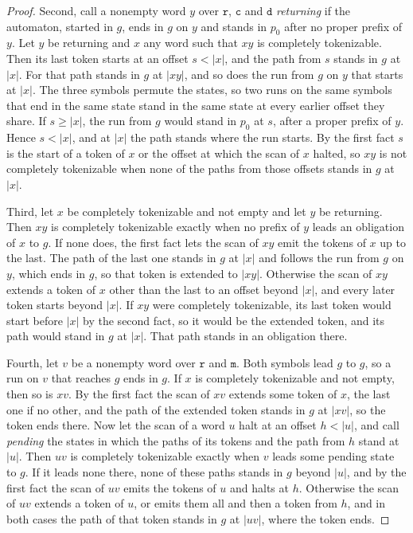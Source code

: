 \documentclass[11pt,a4paper]{article}
\theoremstyle{definition}
\theoremstyle{plain}
\newcommand{\code}[1]{\texttt{#1}}
\begin{document}
\begin{proof}
Second, call a nonempty word $y$ over $\code{r}$, $\code{c}$ and $\code{d}$ \emph{returning} if the automaton, started
in $g$, ends in $g$ on $y$ and stands in $p_0$ after no proper prefix of $y$. Let $y$ be returning and $x$ any word such
that $xy$ is completely tokenizable. Then its last token starts at an offset $s < |x|$, and the path from $s$ stands in
$g$ at $|x|$. For that path stands in $g$ at $|xy|$, and so does the run from $g$ on $y$ that starts at $|x|$. The three
symbols permute the states, so two runs on the same symbols that end in the same state stand in the same state at every
earlier offset they share. If $s \geq |x|$, the run from $g$ would stand in $p_0$ at $s$, after a proper prefix of $y$.
Hence $s < |x|$, and at $|x|$ the path stands where the run starts. By the first fact $s$ is the start of a token of $x$
or the offset at which the scan of $x$ halted, so $xy$ is not completely tokenizable when none of the paths from those
offsets stands in $g$ at $|x|$.

Third, let $x$ be completely tokenizable and not empty and let $y$ be returning. Then $xy$ is completely tokenizable
exactly when no prefix of $y$ leads an obligation of $x$ to $g$. If none does, the first fact lets the scan of $xy$ emit
the tokens of $x$ up to the last. The path of the last one stands in $g$ at $|x|$ and follows the run from $g$ on $y$,
which ends in $g$, so that token is extended to $|xy|$. Otherwise the scan of $xy$ extends a token of $x$ other than the
last to an offset beyond $|x|$, and every later token starts beyond $|x|$. If $xy$ were completely tokenizable, its last
token would start before $|x|$ by the second fact, so it would be the extended token, and its path would stand in $g$ at
$|x|$. That path stands in an obligation there.

Fourth, let $v$ be a nonempty word over $\code{r}$ and $\code{m}$. Both symbols lead $g$ to $g$, so a run on $v$ that
reaches $g$ ends in $g$. If $x$ is completely tokenizable and not empty, then so is $xv$. By the first fact the scan of
$xv$ extends some token of $x$, the last one if no other, and the path of the extended token stands in $g$ at $|xv|$, so
the token ends there. Now let the scan of a word $u$ halt at an offset $h < |u|$, and call \emph{pending} the states in
which the paths of its tokens and the path from $h$ stand at $|u|$. Then $uv$ is completely tokenizable exactly when $v$
leads some pending state to $g$. If it leads none there, none of these paths stands in $g$ beyond $|u|$, and by the
first fact the scan of $uv$ emits the tokens of $u$ and halts at $h$. Otherwise the scan of $uv$ extends a token of $u$,
or emits them all and then a token from $h$, and in both cases the path of that token stands in $g$ at $|uv|$, where the
token ends.


\end{proof}
\end{document}
